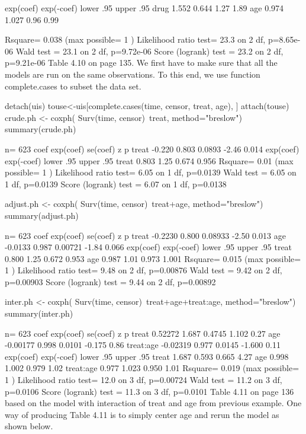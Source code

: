      exp(coef) exp(-coef) lower .95 upper .95
drug     1.552      0.644      1.27      1.89
age      0.974      1.027      0.96      0.99

Rsquare= 0.038   (max possible= 1 )
Likelihood ratio test= 23.3  on 2 df,   p=8.65e-06
Wald test            = 23.1  on 2 df,   p=9.72e-06
Score (logrank) test = 23.2  on 2 df,   p=9.21e-06
Table 4.10 on page 135. We first have to make sure that all the models are run on the same observations. To this end, we use function complete.cases to subset the data set.

detach(uis)
touse<-uis[complete.cases(time, censor, treat, age), ]
attach(touse)
crude.ph <- coxph( Surv(time, censor)~treat, method="breslow")
summary(crude.ph)

  n= 623 
        coef exp(coef) se(coef)     z     p
treat -0.220     0.803   0.0893 -2.46 0.014
      exp(coef) exp(-coef) lower .95 upper .95
treat     0.803       1.25     0.674     0.956
Rsquare= 0.01   (max possible= 1 )
Likelihood ratio test= 6.05  on 1 df,   p=0.0139
Wald test            = 6.05  on 1 df,   p=0.0139
Score (logrank) test = 6.07  on 1 df,   p=0.0138

adjust.ph <- coxph( Surv(time, censor)~treat+age, method="breslow")
summary(adjust.ph)

  n= 623 
         coef exp(coef) se(coef)     z     p
treat -0.2230     0.800  0.08933 -2.50 0.013
age   -0.0133     0.987  0.00721 -1.84 0.066
      exp(coef) exp(-coef) lower .95 upper .95
treat     0.800       1.25     0.672     0.953
age       0.987       1.01     0.973     1.001
Rsquare= 0.015   (max possible= 1 )
Likelihood ratio test= 9.48  on 2 df,   p=0.00876
Wald test            = 9.42  on 2 df,   p=0.00903
Score (logrank) test = 9.44  on 2 df,   p=0.00892

inter.ph <- coxph( Surv(time, censor)~treat+age+treat:age, method="breslow")
summary(inter.ph)

  n= 623 
              coef exp(coef) se(coef)      z    p
treat      0.52272     1.687   0.4745  1.102 0.27
age       -0.00177     0.998   0.0101 -0.175 0.86
treat:age -0.02319     0.977   0.0145 -1.600 0.11
          exp(coef) exp(-coef) lower .95 upper .95
treat         1.687      0.593     0.665      4.27
age           0.998      1.002     0.979      1.02
treat:age     0.977      1.023     0.950      1.01
Rsquare= 0.019   (max possible= 1 )
Likelihood ratio test= 12.0  on 3 df,   p=0.00724
Wald test            = 11.2  on 3 df,   p=0.0106
Score (logrank) test = 11.3  on 3 df,   p=0.0101
Table 4.11 on page 136 based on the model with interaction of treat and age from previous example. One way of producing Table 4.11 is to simply center age and rerun the model as shown below.

